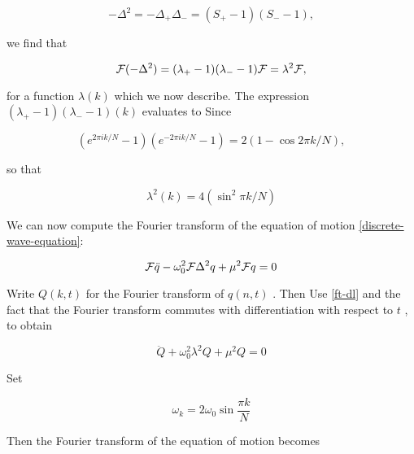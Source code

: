 \begin{equation}
-\Delta^2 = - \Delta_+\Delta_- =  (S_+ - 1)(S_-  -  1),
\end{equation}


we  find  that



\begin{equation}
\label{ft-dl}
\mathcal{F}(-\Delta^2) = (\lambda_+ - 1)(\lambda_- -1)\mathcal{F} =  \lambda^2\mathcal{F},
\end{equation}


for  a  function   $\lambda(k)$  which  we  now  describe.   The  expression 
  $(\lambda_+ - 1)(\lambda_- -1)(k)$  evaluates  to
 Since



\begin{equation}
(e^{2\pi i k/N} - 1)(e^{-2\pi i k/N} - 1) = 2(1 - \cos2\pi k/N),
\end{equation}


so  that



\begin{equation}
\lambda^2(k)  = 4(\sin^2 \pi k/N)
\end{equation}


We  can  now  compute  the  Fourier  transform  of  the  equation  of  motion   \eqref{discrete-wave-equation}:



\begin{equation}
\mathcal{F}\ddot q - \omega_0^2 \mathcal{F} \Delta^2 q + \mu^2 \mathcal{F} q = 0
\end{equation}


Write   $Q(k,t)$  for  the  Fourier  transform  of   $q(n,t)$ .   Then
 Use   \eqref{ft-dl} and  the  fact  that  the  Fourier  transform  commutes  with  differentiation  with  respect  to   $t$ ,  to  obtain



\begin{equation}
\ddot Q + \omega_0^2 \lambda^2 Q + \mu^2 Q = 0
\end{equation}


Set



\begin{equation}
\omega_k = 2\omega_0 \sin  \frac{\pi k}{N}
\end{equation}


Then  the  Fourier  transform  of  the  equation  of  motion  becomes



